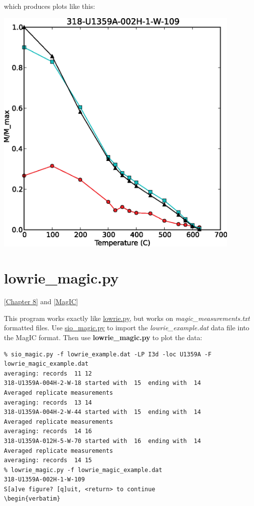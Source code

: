 \documentclass[11pt]{book}
\begin{document}
{{which produces plots like this:

\includegraphics[width=12cm]{EPSfiles/lowrie.eps}

\section{lowrie\_magic.py}
\href{http://Webbook2.html#lowrie}{[Chapter 8]} and \href{#MagIC}{[MagIC]}

This program works exactly like \href{#lowrie.py}{lowrie.py}, but works on {\it magic\_measurements.txt} formatted files.  Use \href{#sio_magic.py}{sio\_magic.py} to import the {\it lowrie\_example.dat} data file into the MagIC format.  Then use {\bf lowrie\_magic.py} to plot the data:

\begin{verbatim}
% sio_magic.py -f lowrie_example.dat -LP I3d -loc U1359A -F lowrie_magic_example.dat
averaging: records  11 12
318-U1359A-004H-2-W-18 started with  15  ending with  14
Averaged replicate measurements
averaging: records  13 14
318-U1359A-004H-2-W-44 started with  15  ending with  14
Averaged replicate measurements
averaging: records  14 16
318-U1359A-012H-5-W-70 started with  16  ending with  14
Averaged replicate measurements
averaging: records  14 15
% lowrie_magic.py -f lowrie_magic_example.dat 
318-U1359A-002H-1-W-109
S[a]ve figure? [q]uit, <return> to continue
\begin{verbatim}



\end{verbatim}}}
\end{document}
